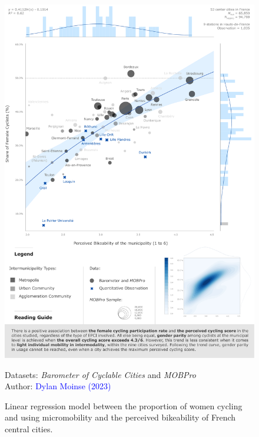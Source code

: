 \begin{refsegment}
\begin{figure}[h!]\vspace*{4pt}
    \caption{Linear regression model between the proportion of women cycling and using micromobility and the perceived bikeability of French central cities.}
    \label{fig-chap4:regression-genre-cyclabilite}
    \centerline{\includegraphics[width=1\columnwidth]{src/Figures/Chap-4/EN_Regression_genre_cyclabilite_OLS.pdf}}
    \vspace{5pt}
    \begin{flushright}\scriptsize{
    Datasets: \textsl{Barometer of Cyclable Cities} \textcolor{blue}{\autocite{fub_barometre_2021}} and \textsl{MOBPro} \textcolor{blue}{\autocite{insee_documentation_2023}}
    \\
    Author: \textcolor{blue}{Dylan Moinse (2023)}
    }\end{flushright}
\end{figure}


\end{refsegment}
